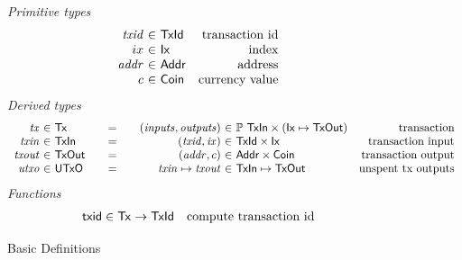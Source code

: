 \documentclass[11pt,a4paper]{article}
\begin{document}
\begin{figure}[h]

\emph{Primitive types}
%
\begin{equation*}
\begin{array}{r@{~\in~}lr}
  \var{txid}
& \type{TxId}
& \text{transaction id}
\\
  ix
& \type{Ix}
& \text{index}
\\
  \var{addr}
& \type{Addr}
& \text{address}
\\
  c
& \type{Coin}
& \text{currency value}
\end{array}
\end{equation*}
%
\emph{Derived types}
%
\begin{equation*}
\begin{array}{r@{~\in~}l@{\qquad=\qquad}r@{~\in~}lr}
  \var{tx}
& \type{Tx}
& (\var{inputs}, \var{outputs})
& \powerset{\type{TxIn}} \times (\type{Ix} \mapsto \type{TxOut})
& \text{transaction}
\\
  \var{txin}
& \type{TxIn}
& (\var{txid}, \var{ix})
& \type{TxId} \times \type{Ix}
& \text{transaction input}
\\
  \var{txout}
& \type{TxOut}
& (\var{addr}, c)
& \type{Addr} \times \type{Coin}
& \text{transaction output}
\\
  \var{utxo}
& \type{UTxO}
& \var{txin} \mapsto \var{txout}
& \type{TxIn} \mapsto \type{TxOut}
& \text{unspent tx outputs}
\end{array}
\end{equation*}
%
\emph{Functions}
%
\begin{equation*}
\begin{array}{lr}
  \mathsf{txid} \in \mathsf{Tx} \to \mathsf{TxId}
& \text{compute transaction id}
\end{array}
\end{equation*}

\caption{Basic Definitions}
\label{fig:basic_definitions}
\end{figure}
\end{document}
